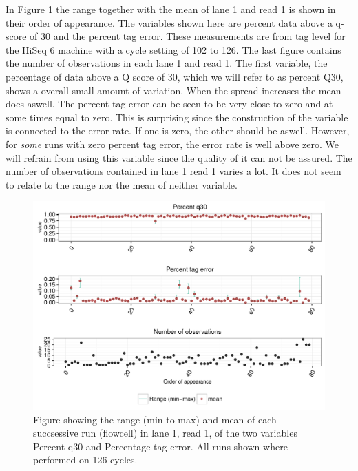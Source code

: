 \documentclass[a4paper,11pt,fleqn,twoside,notitlepage]{report}\usepackage[]{graphicx}\usepackage[]{color}
\makeatletter
\def\maxwidth{ %
  \ifdim\Gin@nat@width>\linewidth
    \linewidth
  \else
    \Gin@nat@width
  \fi
}
\newenvironment{knitrout}{}{} %
\makeatother
\begin{document}
In Figure \ref{fig:HiSeq6Comb} the range together with the mean of lane 1 and read 1 is shown in their order of appearance. The variables shown here are percent data above a q-score of 30 and the percent tag error. These measurements are from tag level for the HiSeq 6 machine with a cycle setting of 102 to 126. The last figure contains the number of observations in each lane 1 and read 1. %
The first variable, the percentage of data above a Q score of 30, which we will refer to as percent Q30, shows a overall small amount of variation. When the spread increases the mean does aswell. The percent tag error can be seen to be very close to zero and at some times equal to zero. This is surprising since the construction of the variable is connected to the error rate. If one is zero, the other should be aswell. However, for \textit{some} runs with zero percent tag error, the error rate is well above zero. We will refrain from using this variable since the quality of it can not be assured. The number of observations contained in lane 1 read 1 varies a lot. It does not seem to relate to the range nor the mean of neither variable.
\begin{knitrout}
\color{fgcolor}\begin{figure}[!htb]
\includegraphics[width=\maxwidth]{figure/HiSeq6Comb-1} \caption[Figure showing the range (min to max) and mean of each succsessive run (flowcell) in lane 1, read 1, of the two variables Percent q30 and Percentage tag error]{Figure showing the range (min to max) and mean of each succsessive run (flowcell) in lane 1, read 1, of the two variables Percent q30 and Percentage tag error. All runs shown where performed on 126 cycles.}\label{fig:HiSeq6Comb}
\end{figure}


\end{knitrout}
\end{document}
